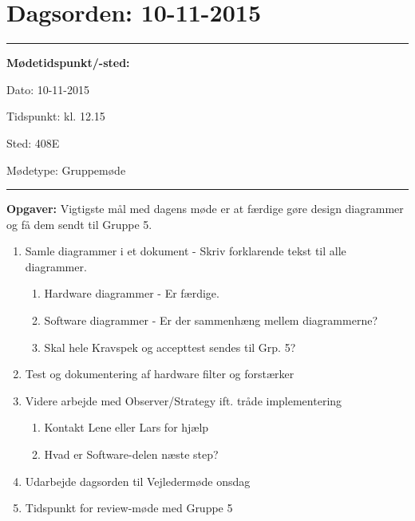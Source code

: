 \newpage
\section{Dagsorden: 10-11-2015}
\hrule



\textbf{Mødetidspunkt/-sted:} 

Dato: \tabto{7em} 10-11-2015

Tidspunkt: \tabto{7em} kl. 12.15

Sted: \tabto{7em} 408E

Mødetype: \tabto{7em} Gruppemøde \newline


\hrule
\textbf{Opgaver:} \newline
Vigtigste mål med dagens møde er at færdige gøre design diagrammer og få dem sendt til Gruppe 5.
\begin{enumerate}
\item Samle diagrammer i et dokument - Skriv forklarende tekst til alle diagrammer.
\begin{enumerate}
\item Hardware diagrammer - Er færdige.
\item Software diagrammer - Er der sammenhæng mellem diagrammerne?
\item Skal hele Kravspek og accepttest sendes til Grp. 5?
\end{enumerate}
\item Test og dokumentering af hardware filter og forstærker
\item Videre arbejde med Observer/Strategy ift. tråde implementering
\begin{enumerate}
\item Kontakt Lene eller Lars for hjælp
\item Hvad er Software-delen næste step?
\end{enumerate}
\item Udarbejde dagsorden til Vejledermøde onsdag
\item Tidspunkt for review-møde med Gruppe 5
\end{enumerate}
